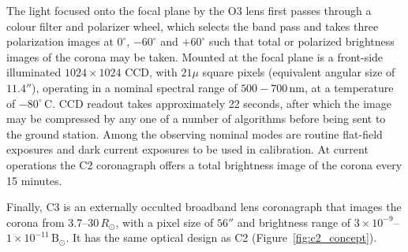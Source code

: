 The light focused onto the focal plane by the O3 lens first passes through a colour filter and polarizer wheel, which selects the band pass and takes three polarization images at $0^{\circ}$, $-60^{\circ}$ and $+60^{\circ}$ such that total or polarized brightness images of the corona may be taken. Mounted at the focal plane is a front-side illuminated $1024\times1024$ CCD, with $21\mu$ square pixels (equivalent angular size of $11.4''$),  operating in a nominal spectral range of $500-700$\,nm, at a temperature of $-80^{\circ}$\,C. CCD readout takes approximately 22 seconds, after which the image may be compressed by any one of a number of algorithms before being sent to the ground station. Among the observing nominal modes are routine flat-field exposures and dark current exposures to be used in calibration. At current operations the C2 coronagraph offers a total brightness image of the corona every 15 minutes.  

Finally, C3 is an externally occulted broadband lens coronagraph that images the corona from 3.7--30$\,R_{\odot}$, with a pixel size of $56''$ and brightness range of $3\times10^{-9}$--$1\times10^{-11}$\,$\mathrm{B}_{\odot}$. It has the same optical design as C2 (Figure~\ref{fig:c2_concept}).

